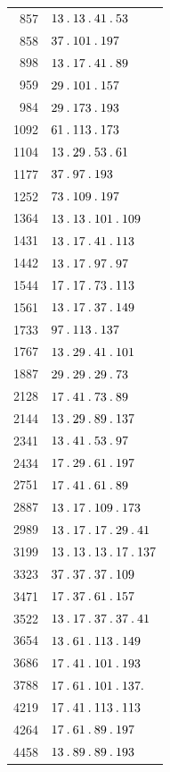 \begin{longtable}{@{}r|l@{}}
857 & $13\mathbin{.} 13\mathbin{.} 41\mathbin{.} 53$\\
858 & $37\mathbin{.} 101\mathbin{.} 197$\\
898 & $13\mathbin{.} 17\mathbin{.} 41\mathbin{.} 89$\\
959 & $29\mathbin{.} 101\mathbin{.} 157$\\
984 & $29\mathbin{.} 173\mathbin{.} 193$\\
1092 & $61\mathbin{.} 113\mathbin{.} 173$\\
1104 & $13\mathbin{.} 29\mathbin{.} 53\mathbin{.} 61$\\
1177 & $37\mathbin{.} 97\mathbin{.} 193$\\
1252 & $73\mathbin{.} 109\mathbin{.} 197$\\
1364 & $13\mathbin{.} 13\mathbin{.} 101\mathbin{.} 109$\\
1431 & $13\mathbin{.} 17\mathbin{.} 41\mathbin{.} 113$\\
1442 & $13\mathbin{.} 17\mathbin{.} 97\mathbin{.} 97$\\
1544 & $17\mathbin{.} 17\mathbin{.} 73\mathbin{.} 113$\\
1561 & $13\mathbin{.} 17\mathbin{.} 37\mathbin{.} 149$\\
1733 & $97\mathbin{.} 113\mathbin{.} 137$\\
1767 & $13\mathbin{.} 29\mathbin{.} 41\mathbin{.} 101$\\
1887 & $29\mathbin{.} 29\mathbin{.} 29\mathbin{.} 73$\\
2128 & $17\mathbin{.} 41\mathbin{.} 73\mathbin{.} 89$\\
2144 & $13\mathbin{.} 29\mathbin{.} 89\mathbin{.} 137$\\
2341 & $13\mathbin{.} 41\mathbin{.} 53\mathbin{.} 97$\\
2434 & $17\mathbin{.} 29\mathbin{.} 61\mathbin{.} 197$\\
2751 & $17\mathbin{.} 41\mathbin{.} 61\mathbin{.} 89$\\
2887 & $13\mathbin{.} 17\mathbin{.} 109\mathbin{.} 173$\\
2989 & $13\mathbin{.} 17\mathbin{.} 17\mathbin{.} 29\mathbin{.} 41$\\
3199 & $13\mathbin{.} 13\mathbin{.} 13\mathbin{.} 17\mathbin{.} 137$\\
3323 & $37\mathbin{.} 37\mathbin{.} 37\mathbin{.} 109$\\
3471 & $17\mathbin{.} 37\mathbin{.} 61\mathbin{.} 157$\\
3522 & $13\mathbin{.} 17\mathbin{.} 37\mathbin{.} 37\mathbin{.} 41$\\
3654 & $13\mathbin{.} 61\mathbin{.} 113\mathbin{.} 149$\\
3686 & $17\mathbin{.} 41\mathbin{.} 101\mathbin{.} 193$\\
3788 & $17\mathbin{.} 61\mathbin{.} 101\mathbin{.} 137\mathbin{.} $\\
4219 & $17\mathbin{.} 41\mathbin{.} 113\mathbin{.} 113$\\
4264 & $17\mathbin{.} 61\mathbin{.} 89\mathbin{.} 197$\\
4458 & $13\mathbin{.} 89\mathbin{.} 89\mathbin{.} 193$\\

\end{longtable}
